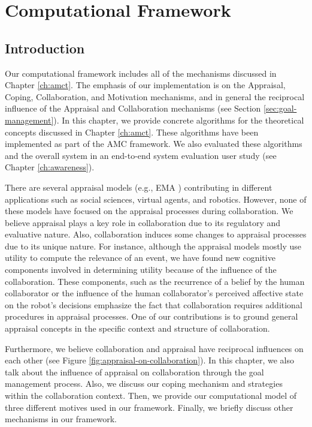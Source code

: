 \documentclass[12pt]{report}
\begin{document}
\chapter{Computational Framework}
\label{ch:appraisals}

\vspace*{-2mm}
\section{Introduction}
\vspace*{-3mm}
Our computational framework includes all of the mechanisms discussed in
Chapter \ref{ch:amct}. The emphasis of our implementation is on the Appraisal,
Coping, Collaboration, and Motivation mechanisms, and in general the reciprocal
influence of the Appraisal and Collaboration mechanisms (see Section
\ref{sec:goal-management}). In this chapter, we provide concrete algorithms for
the theoretical concepts discussed in Chapter \ref{ch:amct}. These algorithms
have been implemented as part of the AMC framework. We also evaluated these
algorithms and the overall system in an end-to-end system evaluation user study
(see Chapter \ref{ch:awareness}).

There are several appraisal models (e.g., EMA \cite{marsella:ema-process-model})
contributing in different applications such as social sciences, virtual agents,
and robotics. However, none of these models have focused on the appraisal
processes during collaboration. We believe appraisal plays a key role in
collaboration due to its regulatory and evaluative nature. Also, collaboration
induces some changes to appraisal processes due to its unique nature. For
instance, although the appraisal models mostly use utility to compute the
relevance of an event, we have found new cognitive components involved in
determining utility because of the influence of the collaboration. These
components, such as the recurrence of a belief by the human collaborator or the
influence of the human collaborator's perceived affective state on the robot's
decisions emphasize the fact that collaboration requires additional procedures
in appraisal processes. One of our contributions is to ground general appraisal
concepts in the specific context and structure of collaboration.

Furthermore, we believe collaboration and appraisal have reciprocal influences
on each other (see Figure \ref{fig:appraisal-on-collaboration}). In this
chapter, we also talk about the influence of appraisal on collaboration through
the goal management process. Also, we discuss our coping mechanism and
strategies within the collaboration context. Then, we provide our computational
model of three different motives used in our framework. Finally, we briefly
discuss other mechanisms in our framework.
\end{document}
